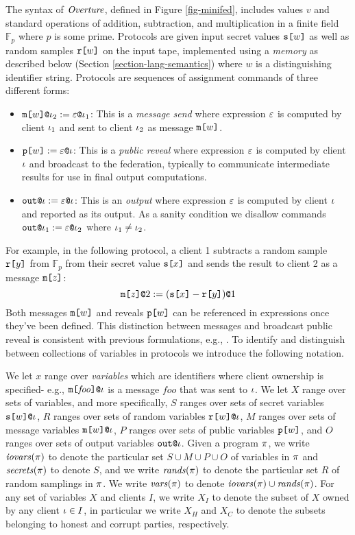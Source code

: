 The syntax of $\mathit{Overture}$, defined in Figure \ref{fig-minifed},
includes values $v$ and standard operations of addition, subtraction,
and multiplication in a finite field $\mathbb{F}_p$ where $p$ is some
prime.  Protocols are given input secret values $\texttt{s[}w\texttt{]}$ as well
as random samples $\texttt{r[}w\texttt{]}$ on the input tape, implemented using a
\emph{memory} as described below (Section
\ref{section-lang-semantics}) where $w$ is a distinguishing 
identifier string. Protocols are sequences of assignment commands of three
different forms:
\begin{itemize}
\item $\texttt{m[}w\texttt{]}\texttt{@}\iota_2 := \varepsilon\texttt{@}\iota_1$: This
  is a \emph{message send} where expression $\varepsilon$ is computed
  by client $\iota_1$ and sent to client $\iota_2$ as message
  $\texttt{m[}w\texttt{]}$.
\item $\texttt{p[}w\texttt{]} := \varepsilon\texttt{@}\iota$: This
  is a \emph{public reveal} where expression $\varepsilon$ is computed
  by client $\iota$ and broadcast to the federation, typically
  to communicate intermediate results for use in final output
  computations.
\item $\texttt{out}\texttt{@}\iota := \varepsilon\texttt{@}\iota$: This
  is an \emph{output} where expression $\varepsilon$ is computed
  by client $\iota$ and reported as its output. As a
  sanity condition we disallow commands
  $\texttt{out}\texttt{@}\iota_1 := \varepsilon\texttt{@}\iota_2$ where $\iota_1\ne\iota_2$.
\end{itemize}
For example, in the following protocol, a client 1
subtracts a random sample $\texttt{r[}y\texttt{]}$ from $\mathbb{F}_p$ from their
secret value $\texttt{s[}x\texttt{]}$ and sends the result to client
2 as a message $\texttt{m[}z\texttt{]}$:
$$
\texttt{m[}z\texttt{]}\texttt{@}2 := (\texttt{s[}x\texttt{]} - \texttt{r[}y\texttt{]})\texttt{@}1
$$ Both messages $\texttt{m[}w\texttt{]}$ and reveals $\texttt{p[}w\texttt{]}$ can be referenced in
expressions once they've been defined.  This distinction between
messages and broadcast public reveal is consistent with previous
formulations, e.g., \cite{6266151}. To identify and distinguish
between collections of variables in protocols we introduce the
following notation.
\begin{definition}
We let $x$ range over \emph{variables} which are identifiers where
client ownership is specified- e.g.,
$\texttt{m[}\mathit{foo}\texttt{]}\texttt{@}\iota$ is a message $\mathit{foo}$ that
was sent to $\iota$. We let $X$ range over sets of variables, and more
specifically, $S$ ranges over sets of secret variables
$\texttt{s[}w\texttt{]}\texttt{@}\iota$, $R$ ranges over sets of random variables
$\texttt{r[}w\texttt{]}\texttt{@}\iota$, $M$ ranges over sets of message variables
$\texttt{m[}w\texttt{]}\texttt{@}\iota$, $P$ ranges over sets of public variables
$\texttt{p[}w\texttt{]}$, and $O$ ranges over sets of output variables $\texttt{out}\texttt{@}\iota$.
Given a program $\pi$, we write $\mathit{iovars}(\pi)$ to denote the
particular set $S \cup M \cup P \cup O$ of variables in $\pi$ and
$\mathit{secrets}(\pi)$ to denote $S$, and we write $\mathit{rands}(\pi)$ to
denote the particular set $R$ of random samplings in $\pi$. We write
$\mathit{vars}(\pi)$ to denote $\mathit{iovars}(\pi) \cup \mathit{rands}(\pi)$. For any set
of variables $X$ and clients $I$, we write $X_I$ to denote the subset
of $X$ owned by any client $\iota \in I$, in particular we write $X_H$
and $X_C$ to denote the subsets belonging to honest and corrupt
parties, respectively.
\end{definition}

